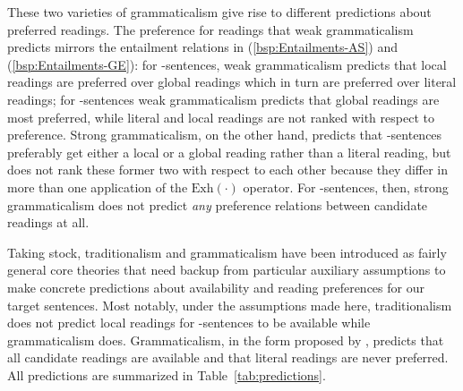 \documentclass[fleqn,reqno,10pt]{article}
\newcommand{\as}{\acro{as}}
\renewcommand{\es}{\acro{es}}
\newcommand{\exh}{\ensuremath{\mathrm{Exh}}}
\begin{document}
These two varieties of grammaticalism give rise to different
predictions about preferred readings. The preference for readings that
weak grammaticalism predicts mirrors the entailment relations in
(\ref{bsp:Entailments-AS}) and (\ref{bsp:Entailments-GE}): for
\as-sentences, weak grammaticalism predicts that local readings are
preferred over global readings which in turn are preferred over
literal readings; for \es-sentences weak grammaticalism predicts that
global readings are most preferred, while literal and local readings
are not ranked with respect to preference. Strong grammaticalism, on
the other hand, predicts that \as-sentences preferably get either a
local or a global reading rather than a literal reading, but does not
rank these former two with respect to each other because they differ
in more than one application of the $\exh(\cdot)$ operator. For
\es-sentences, then, strong grammaticalism does not predict \emph{any}
preference relations between candidate readings at all.

\medskip

Taking stock, traditionalism and grammaticalism have been introduced
as fairly general core theories that need backup from particular
auxiliary assumptions to make concrete predictions about availability
and reading preferences for our target sentences. Most notably, under
the assumptions made here, traditionalism does not predict local
readings for \es-sentences to be available while grammaticalism does.
Grammaticalism, in the form proposed by
\citet{ChierchiaFox2008:The-Grammatical}, predicts that all candidate
readings are available and that literal readings are never preferred. All predictions are summarized in
Table~\ref{tab:predictions}.
\end{document}
